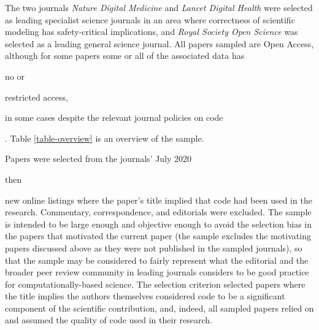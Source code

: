 The two journals \emph{Nature Digital Medicine\/} and \emph{Lancet Digital Health\/} were selected as leading specialist science journals in an area where correctness of scientific modeling has safety-critical implications, and \emph{Royal Society Open Science\/} was selected as a leading general science journal. All papers sampled are Open Access, although for some papers some or all of the associated data has \begin{change}no or\end{change} restricted access, \begin{change}in some cases despite the relevant journal policies on code\end{change}. Table \ref{table-overview} is an overview of the sample.  

Papers were selected from the journals' July 2020 \begin{change}then\end{change} new online listings where the paper's title implied that code had been used in the research. Commentary, correspondence, and editorials were excluded. The sample is intended to be large enough and objective enough to avoid the selection bias in the papers that motivated the current paper (the sample excludes the motivating papers discussed above as they were not published in the sampled journals), so that the sample may be considered to fairly represent what the editorial and the broader peer review community in leading journals considers to be good practice for computationally-based science. The selection criterion selected papers where the title implies the authors themselves considered code to be a significant component of the scientific contribution, and, indeed, all sampled papers relied on and assumed the quality of code used in their research. 

